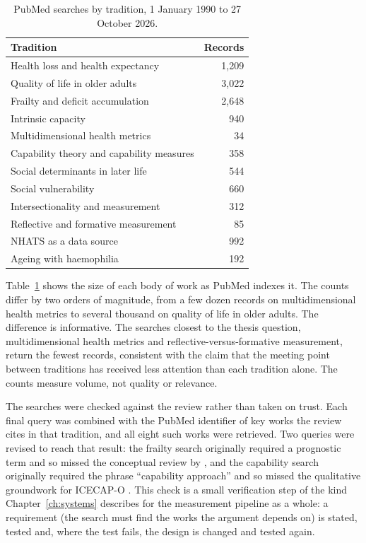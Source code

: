 \begin{table}[htbp]
\centering
\caption{PubMed searches by tradition, 1 January 1990 to 27 October 2026.}
\label{tab:search}
\footnotesize
\renewcommand{\arraystretch}{1.15}
\begin{tabular}{p{9cm} r}
\toprule
\textbf{Tradition} & \textbf{Records} \\
\midrule
Health loss and health expectancy & 1,209 \\
Quality of life in older adults & 3,022 \\
Frailty and deficit accumulation & 2,648 \\
Intrinsic capacity & 940 \\
Multidimensional health metrics & 34 \\
Capability theory and capability measures & 358 \\
Social determinants in later life & 544 \\
Social vulnerability & 660 \\
Intersectionality and measurement & 312 \\
Reflective and formative measurement & 85 \\
NHATS as a data source & 992 \\
Ageing with haemophilia & 192 \\
\bottomrule
\end{tabular}
\end{table}

Table~\ref{tab:search} shows the size of each body of work as PubMed indexes it. The counts differ by two orders of magnitude, from a few dozen records on multidimensional health metrics to several thousand on quality of life in older adults. The difference is informative. The searches closest to the thesis question, multidimensional health metrics and reflective-versus-formative measurement, return the fewest records, consistent with the claim that the meeting point between traditions has received less attention than each tradition alone. The counts measure volume, not quality or relevance.

The searches were checked against the review rather than taken on trust. Each final query was combined with the PubMed identifier of key works the review cites in that tradition, and all eight such works were retrieved. Two queries were revised to reach that result: the frailty search originally required a prognostic term and so missed the conceptual review by \citet{rockwood_mitnitski_2007}, and the capability search originally required the phrase ``capability approach'' and so missed the qualitative groundwork for ICECAP-O \citep{icecap_o}. This check is a small verification step of the kind Chapter~\ref{ch:systems} describes for the measurement pipeline as a whole: a requirement (the search must find the works the argument depends on) is stated, tested and, where the test fails, the design is changed and tested again.

